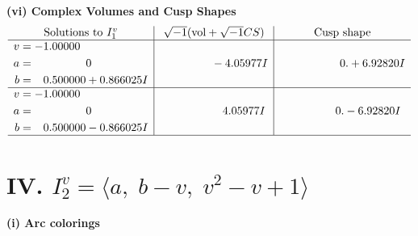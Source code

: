 \documentclass[1p]{elsarticle_modified}
\theoremstyle{definition}
\newcommand{\I}{\sqrt{-1}}
\begin{document}
\newpage\flushleft \textbf{(vi) Complex Volumes and Cusp Shapes}
$$\begin{array}{c|c|c}  
\text{Solutions to }I^v_{1}& \I (\text{vol} + \sqrt{-1}CS) & \text{Cusp shape}\\
 \hline 
\begin{aligned}
v &= -1.00000\phantom{ +0.000000I} \\
a &= \phantom{-0.000000 } 0 \\
b &= \phantom{-}0.500000 + 0.866025 I\end{aligned}
 & \phantom{-0.000000 } -4.05977 I & \phantom{-0.000000 -}0. + 6.92820 I \\ \hline\begin{aligned}
v &= -1.00000\phantom{ +0.000000I} \\
a &= \phantom{-0.000000 } 0 \\
b &= \phantom{-}0.500000 - 0.866025 I\end{aligned}
 & \phantom{-0.000000 -}4.05977 I & \phantom{-0.000000 } 0. - 6.92820 I\\
 \hline 
 \end{array}$$\newpage\newpage\renewcommand{\arraystretch}{1}
\centering \section*{IV. $I^v_{2}= \langle a,\;b- v,\;v^2- v+1 \rangle$}
\flushleft \textbf{(i) Arc colorings}\\
\end{document}
